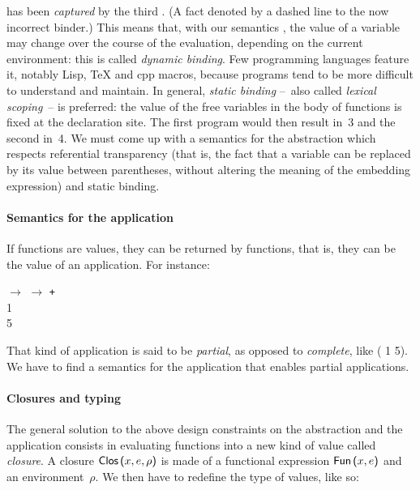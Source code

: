 has been \emph{captured} by the third \Xlet. (A fact denoted by a
dashed line to the now incorrect binder.) This means that, with our
semantics , the value of a variable may change
over the course of the evaluation, depending on the current
environment: this is called \emph{dynamic binding}. Few programming
languages feature it, notably Lisp, \TeX{} and \textsf{cpp} macros,
because programs tend to be more difficult to understand and
maintain. In general, \emph{static binding} --~also called
\emph{lexical scoping}~-- is preferred: the value of the free
variables in the body of functions is fixed at the declaration
site. The first program would then result in~3 and the second in~4. We
must come up with a semantics for the abstraction which respects
referential transparency (that is, the fact that a variable can be
replaced by its value between parentheses, without altering the
meaning of the embedding expression) and static binding.

\paragraph{Semantics for the application}

If functions are values, they can be returned by functions, that is,
they can be the value of an application. For instance:
\begin{tabbing}
 \Xlet {} \equal \Xfun {} \(\rightarrow\) \Xfun
  \(\rightarrow\)  \texttt{+}  \Xin\\
 \quad \Xlet {} \equal {} \num{1}\\
 \Xin {} \num{5}
\end{tabbing}
That kind of application is said to be \emph{partial}, as opposed
to \emph{complete}, like ( \num{1} \num{5}). We have to
find a semantics for the application that enables partial
applications.

\paragraph{Closures and typing}

The general solution to the above design constraints on the
abstraction and the application consists in evaluating functions into
a new kind of value called \emph{closure}. A closure
$\textsf{Clos} \, \textsf{(}{x},e,\rho\textsf{)}$ is made of a functional expression
$\textsf{Fun} \, \textsf{(}{x},e\textsf{)}$ and an environment~$\rho$. We then have
to redefine the type of values, like so:

